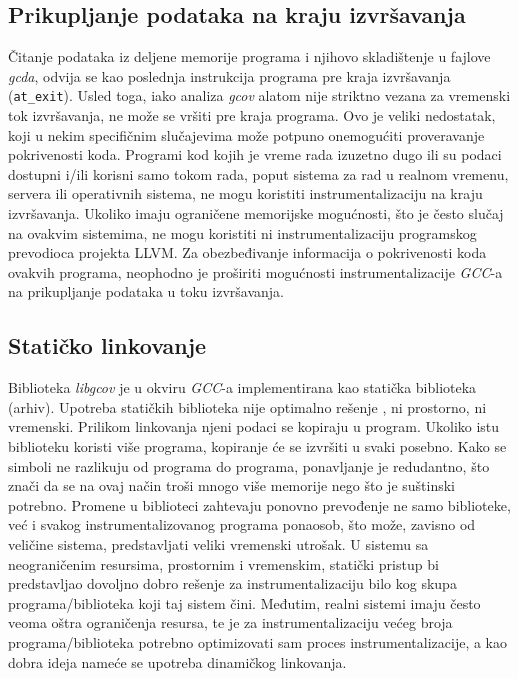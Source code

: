 \documentclass[12pt,oneside]{memoir}
\newcommand{\kod}[1]{\texttt{#1}}
\newcommand{\strano}[1]{\textit{#1}}
\begin{document}
\subsection{Prikupljanje podataka na kraju izvršavanja}


Čitanje podataka iz deljene memorije programa i njihovo skladištenje u fajlove \strano{gcda}, odvija se kao poslednja instrukcija programa pre kraja izvršavanja (\kod{at\_exit}). Usled toga, iako analiza \strano{gcov} alatom nije striktno vezana za vremenski tok izvršavanja, ne može se vršiti pre kraja programa. Ovo je veliki nedostatak, koji u nekim specifičnim slučajevima može potpuno onemogućiti proveravanje pokrivenosti koda. Programi kod kojih je vreme rada izuzetno dugo ili su podaci dostupni i/ili korisni samo tokom rada, poput sistema za rad u realnom vremenu, servera ili operativnih sistema, ne mogu koristiti instrumentalizaciju na kraju izvršavanja. Ukoliko imaju ograničene memorijske mogućnosti, što je često slučaj na ovakvim sistemima, ne mogu koristiti ni instrumentalizaciju programskog prevodioca projekta LLVM. Za obezbeđivanje informacija o pokrivenosti koda ovakvih programa, neophodno je proširiti mogućnosti instrumentalizacije \strano{GCC}-a na prikupljanje podataka u toku izvršavanja.


\subsection{Statičko linkovanje}


Biblioteka \strano{libgcov} je u okviru \strano{GCC}-a implementirana kao statička biblioteka (arhiv). Upotreba statičkih biblioteka nije optimalno rešenje \cite{staVSdinLINK}, ni prostorno, ni vremenski. Prilikom linkovanja njeni podaci se kopiraju u program. Ukoliko istu biblioteku koristi više programa, kopiranje će se izvršiti u svaki posebno. Kako se simboli ne razlikuju od programa do programa, ponavljanje je redudantno, što znači da se na ovaj način troši mnogo više memorije nego što je suštinski potrebno. Promene u biblioteci zahtevaju ponovno prevođenje ne samo biblioteke, već i svakog instrumentalizovanog programa ponaosob, što može, zavisno od veličine sistema, predstavljati veliki vremenski utrošak. U sistemu sa neograničenim resursima, prostornim i vremenskim, statički pristup bi predstavljao dovoljno dobro rešenje za instrumentalizaciju bilo kog skupa programa/biblioteka koji taj sistem čini. Međutim, realni sistemi imaju često veoma oštra ograničenja resursa, te je za instrumentalizaciju većeg broja programa/biblioteka potrebno optimizovati sam proces instrumentalizacije, a kao dobra ideja nameće se upotreba dinamičkog linkovanja.
\end{document}
